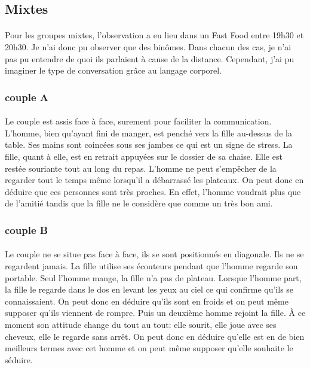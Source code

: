 \subsection{Mixtes}

\paragraph{} Pour les groupes mixtes, l'observation a eu lieu dans un Fast Food
entre 19h30 et 20h30. Je n'ai donc pu observer que des binômes. Dans chacun des
cas, je n'ai pas pu entendre de quoi ils parlaient à cause de la distance.
Cependant, j'ai pu imaginer le type de conversation grâce au langage corporel.

\subsubsection{couple A}

\paragraph{} Le couple est assis face à face, surement pour faciliter la
communication. L'homme, bien qu'ayant fini de manger, est penché vers la fille
au-dessus de la table. Ses mains sont coincées sous ses jambes ce qui est un
signe de stress. La fille, quant à elle, est en retrait appuyées sur le dossier
de sa chaise. Elle est restée souriante tout au long du repas. L'homme ne peut
s'empêcher de la regarder tout le temps même lorsqu'il a débarrassé les
plateaux. On peut donc en déduire que ces personnes sont très proches. En
effet, l'homme voudrait plus que de l'amitié tandis que la fille ne le
considère que comme un très bon ami.

\subsubsection{couple B}

\paragraph{} Le couple ne se situe pas face à face, ils se sont positionnés en
diagonale. Ils ne se regardent jamais. La fille utilise ses écouteurs pendant
que l'homme regarde son portable. Seul l'homme mange, la fille n'a pas de
plateau. Lorsque l'homme part, la fille le regarde dans le dos en levant les
yeux au ciel ce qui confirme qu'ils se connaissaient. On peut donc en déduire
qu'ils sont en froids et on peut même supposer qu'ils viennent de rompre. Puis
un deuxième homme rejoint la fille. À ce moment son attitude change du tout au
tout: elle sourit, elle joue avec ses cheveux, elle le regarde sans arrêt. On
peut donc en déduire qu'elle est en de bien meilleurs termes avec cet homme et
on peut même supposer qu'elle souhaite le séduire.

